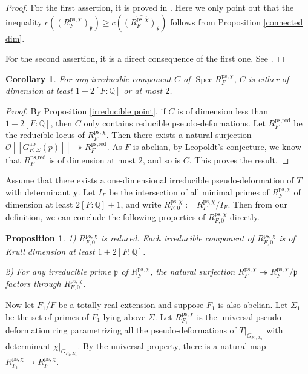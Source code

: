 \documentclass[a4paper, 12pt]{amsart}
\newtheorem{cor}[thm]{Corollary}
\newtheorem{prop}[thm]{Proposition}
\DeclareMathOperator{\Spec}{Spec}
\def\ps{\mathrm{ps}}
\newcommand{\Q}{\mathbb{Q}}
\newcommand{\cO}{\mathcal{O}}
\newcommand{\kp}{\mathfrak{p}}
\begin{document}
	\begin{proof}
		For the first assertion, it is proved in \cite[Lemma 7.4.6]{pan2022fontaine}. Here we only point out that the inequality $c((R_{F}^{\ps, \chi})_{\kp}) \ge  c(\widehat{(R_{F}^{\ps, \chi})_{\kp}})$ follows from Proposition \ref{connected dim}.
		
		For the second assertion, it is a direct consequence of the first one. See \cite[Remark 3.2.8]{Zhang:2024ab}.
	\end{proof}
	
	\begin{cor}\label{structure of ps}
		For any irreducible component $C$ of $ \Spec R_{F}^{\ps, \chi}$, $C$ is either of dimension at least $1+2[F:\Q]$ or at most $2$.
	\end{cor}
	
	\begin{proof}
		By Proposition \ref{irreducible point}, if $C$ is of dimension less than $1+2[F:\Q]$, then $C$ only contains reducible pseudo-deformations. Let $R_{F}^{\operatorname{ps, red}}$ be the reducible locus of $ R_{F}^{\ps, \chi}$. Then there exists a natural surjection $\cO[[G_{F, \Sigma}^{\operatorname{ab}}(p)]] \twoheadrightarrow R_{F}^{\operatorname{ps, red}}$. As $F$ is abelian, by Leopoldt's conjecture, we know that $R_{F}^{\operatorname{ps, red}}$ is of dimension at most  $2$, and so is $C$. This proves the result.
	\end{proof}
	
    Assume that there exists a one-dimensional irreducible pseudo-deformation of $T$ with determinant $\chi$. Let $I_F$ be the intersection of all minimal primes of $R_{F}^{\ps, \chi} $ of dimension at least $2[F:\Q]+1 $, and write $ R_{F,0}^{\ps, \chi} := R_{F}^{\ps, \chi}/I_F$. Then from our definition, we can conclude the following properties of $ R_{F,0}^{\ps, \chi}$ directly.
    
    \begin{prop}\label{def of 0}
    	1) $ R_{F,0}^{\ps, \chi}$ is reduced. Each irreducible component of $ R_{F,0}^{\ps, \chi}$ is of Krull dimension at least $1+2[F:\Q]$.
    	
    	2) For any irreducible prime $\kp$ of $R_{F}^{\ps, \chi} $, the natural surjection $ R_{F}^{\ps, \chi} \twoheadrightarrow R_{F}^{\ps, \chi}/\kp$ factors through $ R_{F,0}^{\ps, \chi}$.
    \end{prop}
    
    Now let $F_1/F$ be a totally real extension and suppose $F_1$ is also abelian. Let $\Sigma_1$ be the set of primes of $F_1$ lying above $\Sigma$. Let $ R_{F_1}^{\ps, \chi}$ is the universal pseudo-deformation ring parametrizing all the pseudo-deformations of $T|_{G_{F_1, \Sigma_1}}$ with determinant $\chi|_{G_{F_1, \Sigma_1}}$. By the universal property, there is a natural map $ R_{F_1}^{\ps, \chi} \to R_{F}^{\ps, \chi}$.
    
\end{document}
